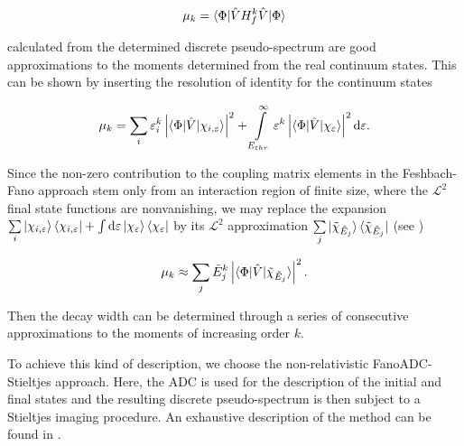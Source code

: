\begin{equation}
 \mu_k = \braket{ \Phi | \hat{V} H^k_f \hat{V} | \Phi }
\end{equation}

calculated from the determined
discrete pseudo-spectrum are good approximations to the moments determined
from the real continuum states.
This can be shown by inserting the resolution of identity for
the continuum states

\begin{equation}
 \mu_k = \sum_i \varepsilon_i^k
         \left| \braket{ \Phi | \hat{V} | \chi_{i,\varepsilon} } \right| ^2
       + \int\limits_{E_{thr}}^{\infty} \varepsilon^k
         \left| \braket{\Phi|\hat{V}|\chi_{\varepsilon}} \right|^2 \mathrm{d}\varepsilon  .
\end{equation}

Since the non-zero contribution to the coupling matrix elements in the
Feshbach-Fano approach stem only
from an interaction region of finite size, where the $\mathcal{L}^2$ final
state functions are nonvanishing, we may replace the expansion
$\sum\limits_i \ket{\chi_{i,\varepsilon}} \bra{\chi_{i,\varepsilon}}
 + \int \mathrm{d}\varepsilon \ket{\chi_\varepsilon} \bra{\chi_\varepsilon}$
by its $\mathcal{L}^2$ approximation
$\sum\limits_j \ket{\tilde{\chi}_{\tilde{E}_j}} \bra{\tilde{\chi}_{\tilde{E}_j}}$
(see \cite{Reinhardt79})

\begin{equation}
 \label{eq:moment_discrete}
 \mu_k \approx \sum\limits_j \tilde{E}_j ^k
         \left| \braket{\Phi|\hat{V}|\tilde{\chi}_{\tilde{E}_j}}  \right|^2 .
\end{equation}

Then the decay width can be determined through a series of
consecutive approximations to the moments of increasing order $k$.

To achieve this kind of description, we choose the non-relativistic
FanoADC-Stieltjes approach.
Here, the ADC is used for the description of the
initial and final states and the resulting discrete pseudo-spectrum
is then subject to a Stieltjes imaging procedure.
An exhaustive description of the method can be found in \cite{Fasshauer15_1,Fasshauer_thesis}.

